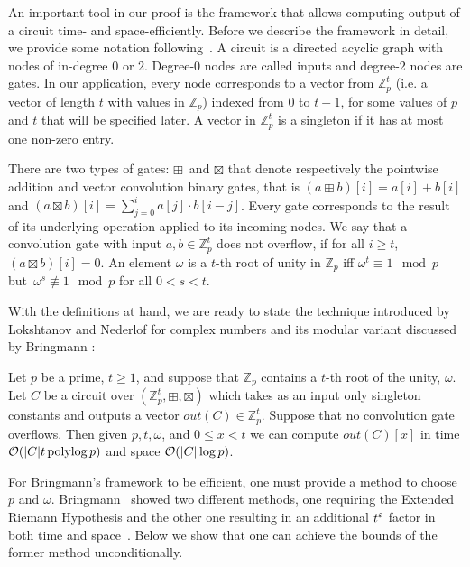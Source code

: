 An important tool in our proof is the framework that allows computing output of a circuit time- and space-efficiently.
Before we describe the framework in detail, we provide some notation following~\cite{Bringmann17}.
A circuit is a directed acyclic graph with nodes of in-degree $0$ or $2$.
Degree-0 nodes are called inputs and degree-2 nodes are gates.
In our application, every node corresponds to a vector from $\mathbb{Z}_p^t$ (i.e. a vector of length $t$ with values in $\mathbb{Z}_p$) indexed from 0 to $t-1$, for some values of $p$ and $t$ that will be specified later.
A vector in $\mathbb{Z}_p^t$ is a singleton if it has at most one non-zero entry.

There are two types of gates: $\boxplus$~and $\boxtimes$ that denote respectively the pointwise addition and vector convolution binary gates, that is $(a\boxplus b)[i]=a[i]+b[i]$ and $(a\boxtimes b)[i]=\sum_{j=0}^ia[j]\cdot b[i-j]$.
Every gate corresponds to the result of its underlying operation applied to its incoming nodes. We say that a convolution gate with input $a, b \in \mathbb{Z}_p^t$ does not overflow, if for all $i \ge t$, $(a\boxtimes b)[i] = 0$. 
An element $\omega$ is a $t$-th root of unity in $\mathbb{Z}_p$ iff $\omega^t \equiv 1 \mod p$ but~$\omega^s \not\equiv 1 \mod p$ for all $0<s<t$.

With the definitions at hand, we are ready to state the technique introduced by Lokshtanov and Nederlof \cite{LokshtanovN10} for complex numbers and its modular variant discussed by Bringmann \cite{Bringmann17}:


\begin{thm}\label{thm:circuits_framework}
 Let $p$ be a prime, $t \geq 1$, and suppose that $\mathbb{Z}_p$ contains a $t$-th root of the unity, $\omega$.
 Let $C$ be a circuit over $(\mathbb{Z}_p^t,\boxplus,\boxtimes)$ which takes as an input only singleton constants and outputs a vector $out(C) \in \mathbb{Z}_p^t$.
 Suppose that no convolution gate overflows.
 Then given $p,t,\omega$, and $0\leq x < t$ we can compute $out(C)[x]$ in time $\mathcal{O}(|C|t\operatorname{polylog} p)$ and space $\mathcal{O}(|C|\log p)$.
\end{thm}

For Bringmann's framework to be efficient, one must provide a method to choose $p$ and $\omega$. Bringmann~\cite{Bringmann17} showed two different methods, one requiring the Extended Riemann Hypothesis and the other one resulting in an 
additional $t^\varepsilon$ factor in both time and space~\cite[Lemma 4.4]{Bringmann17}. Below we show that one can achieve the bounds of the former method unconditionally.


